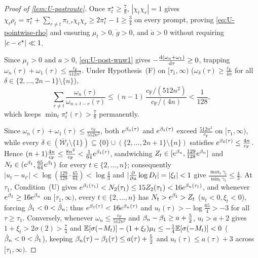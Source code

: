 \begin{proof}[Proof of \cref{lem:U-postroute}]
Once $\pi_t^\star \ge \frac{7}{8}$, $|\chi_t\chi_r| = 1$ gives $\chi_t\rho_t = \pi_t^\star + \sum_{r\ne t}\pi_{t,r}\chi_t\chi_r \ge 2\pi_t^\star - 1 \ge \frac{3}{4}$ on every prompt, proving \cref{eq:U-pointwise-rho} and ensuring $\mu_t > 0$, $\dot g > 0$, and $\dot a > 0$ without requiring $|c - c^\star| \ll 1$.

Since $\mu_t > 0$ and $a > 0$, \cref{eq:U-post-wnw1} gives $-\ddtau{(\omega_n + \omega_1)} \ge 0$, trapping $\omega_n(\tau) + \omega_1(\tau) \le \frac{c_{\mathrm F}}{512n^2}$. Under Hypothesis~(F) on $[\tau_1, \infty)$ ($\omega_\delta(\tau) \ge \frac{c_{\mathrm F}}{4n}$ for all $\delta \in \{2,\ldots,2n-1\}\setminus\{n\}$),
\[
  \sum_{r\ne t}\frac{\omega_n(\tau)}{\omega_{n+t-r}(\tau)}
  \le (n-1)\,\frac{c_{\mathrm F}/(512n^2)}{c_{\mathrm F}/(4n)}
  < \frac{1}{128},
\]
which keeps $\min_t\pi_t^\star(\tau) > \frac{7}{8}$ permanently.

Since $\omega_n(\tau) + \omega_1(\tau) \le \frac{c_{\mathrm F}}{512n^2}$, both $e^{\beta_n(\tau)}$ and $e^{\beta_1(\tau)}$ exceed $\frac{512n^2}{c_{\mathrm F}}$ on $[\tau_1, \infty)$, while every $\delta \in (\overline{\mathcal W}_t \setminus \{1\}) \subseteq \{0\} \cup (\{2,\ldots,2n+1\}\setminus\{n\})$ satisfies $e^{\beta_\delta(\tau)} \le \frac{4n}{c_{\mathrm F}}$. Hence $(n+1)\frac{4n}{c_{\mathrm F}} \le \frac{8n^2}{c_{\mathrm F}} < \frac{1}{64}e^{\beta_1(\tau)}$, sandwiching $Z_t \in [e^{\beta_n}, \frac{129}{128}e^{\beta_n}]$ and $N_t \in (e^{\beta_1}, \frac{65}{64}e^{\beta_1})$ for every $t \in \{2,\ldots,n\}$; consequently $|u_t - u_{t'}| < \log(\frac{129}{128}\cdot\frac{65}{64}) < \log\frac{4}{3}$ and $|\pd{}{u}\log D_t| = |\xi_t| < 1$ give $\frac{\max_t\gamma_t}{\min_t\gamma_t} \le \frac{4}{3}$. At $\tau_1$, Condition~(U) gives $e^{\beta_1(\tau_1)} < N_2(\tau_1) \le 15 Z_2(\tau_1) < 16 e^{\beta_n(\tau_1)}$, and whenever $e^{\beta_1} \ge 16 e^{\beta_n}$ on $[\tau_1, \infty)$, every $t \in \{2,\ldots,n\}$ has $N_t > e^{\beta_1} > Z_t$ ($u_t < 0, \xi_t < 0$), forcing $\dot{\beta}_1 < 0 < \dot{\beta}_n$; thus $e^{\beta_1(\tau)} < 16 e^{\beta_n(\tau)}$ and $u_t(\tau) > -\log\frac{65}{4} > -3$ for all $\tau \ge \tau_1$. Conversely, whenever $\omega_n \le \frac{c_{\mathrm F}}{512n^2}$ and $\beta_n - \beta_1 \ge a + \frac{5}{2}$, $u_t > a + 2$ gives $1 + \xi_t > 2\sigma(2) > \frac{7}{4}$ and $\mathbb E[\sigma(-M_t)] - (1+\xi_t)\mu_t \le -\frac{1}{4}\mathbb E[\sigma(-M_t)] < 0$ ($\dot{\beta}_n < 0 < \dot{\beta}_1$), keeping $\beta_n(\tau) - \beta_1(\tau) \le a(\tau) + \frac{5}{2}$ and $u_t(\tau) \le a(\tau) + 3$ across $[\tau_1, \infty)$.


\end{proof}
